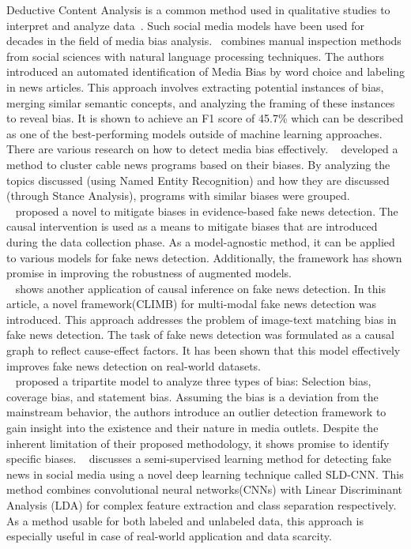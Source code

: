 \documentclass[11pt,a4paper]{article}
\begin{document}
Deductive Content Analysis is a common method used in qualitative studies to interpret and analyze data~\cite{graneheim_2017_methodological}. Such social media models have been used for decades in the field of media bias analysis.~\cite{hamborg_2019_automated} combines manual inspection methods from social sciences with natural language processing techniques. The authors introduced an automated identification of Media Bias by word choice and labeling in news articles. This approach involves extracting potential instances of bias, merging similar semantic concepts, and analyzing the framing of these instances to reveal bias. It is shown to achieve an F1 score of 45.7\% which can be described as one of the best-performing models outside of machine learning approaches.\\
There are various research on how to detect media bias effectively.
~\cite{benson_2024_developing} developed a method to cluster cable news programs based on their biases. By analyzing the topics discussed (using Named Entity Recognition) and how they are discussed (through Stance Analysis), programs with similar biases were grouped.\\
~\cite{wu_2022_bias} proposed a novel to mitigate biases in evidence-based fake news detection. The causal intervention is used as a means to mitigate biases that are introduced during the data collection phase. As a model-agnostic method, it can be applied to various models for fake news detection. Additionally, the framework has shown promise in improving the robustness of augmented models.\\
~\cite{hu_2022_causal} shows another application of causal inference on fake news detection. In this article, a novel framework(CLIMB) for multi-modal fake news detection was introduced. This approach addresses the problem of image-text matching bias in fake news detection. The task of fake news detection was formulated as a causal graph to reflect cause-effect factors. It has been shown that this model effectively improves fake news detection on real-world datasets.\\
~\cite{arruda_2020_analysing} proposed a tripartite model to analyze three types of bias: Selection bias, coverage bias, and statement bias. Assuming the bias is a deviation from the mainstream behavior, the authors introduce an outlier detection framework to gain insight into the existence and their nature in media outlets. Despite the inherent limitation of their proposed methodology, it shows promise to identify specific biases.
~\cite{mansouri_2020_a} discusses a semi-supervised learning method for detecting fake news in social media using a novel deep learning technique called SLD-CNN. This method combines convolutional neural networks(CNNs) with Linear Discriminant Analysis (LDA) for complex feature extraction and class separation respectively. As a method usable for both labeled and unlabeled data, this approach is especially useful in case of real-world application and data scarcity.\\
\end{document}

